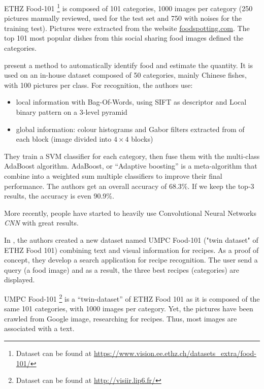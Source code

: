ETHZ Food-101 \footnote{Dataset can be found at  \url{https://www.vision.ee.ethz.ch/datasets_extra/food-101/}} is composed of 101 categories, 1000 images per category (250 pictures manually reviewed, used for the test set and 750 with noises for the training test). Pictures were extracted from the website \href{http://www.foodspotting.com/}{foodspotting.com}. The top 101 most popular dishes from this social sharing food images defined the categories.


\cite{Chen2012} present a method to automatically identify food and estimate the quantity. It is used on an in-house dataset composed of 50 categories, mainly Chinese fishes, with 100 pictures per class. For recognition, the authors use:
\begin{itemize}
    \item local information with Bag-Of-Words, using SIFT as descriptor and Local binary pattern on a 3-level pyramid
    \item global information: colour histograms and Gabor filters extracted from of each block (image divided into $4 \times 4$ blocks)
\end{itemize}

They train a SVM classifier for each category, then fuse them with the multi-class AdaBoost algorithm. AdaBoost, or \enquote{Adaptive boosting} is a meta-algorithm that combine into a weighted sum multiple classifiers to improve their final performance.
The authors get an overall accuracy of 68.3\%. If we keep the top-3 results, the accuracy is even 90.9\%.



More recently, people have started to heavily use Convolutional Neural Networks \textit{CNN} with great results.


In \cite{Wang2015}, the authors created a new dataset named UMPC Food-101 ("twin dataset" of ETHZ Food 101) combining text and visual information for recipes. As a proof of concept, they develop a search application for recipe recognition. The user send a query (a food image) and as a result, the three best recipes (categories) are displayed.

UMPC Food-101 \footnote{Dataset can be found at \url{http://visiir.lip6.fr/}} is a \enquote{twin-dataset} of ETHZ Food 101 as it is composed of the same 101 categories, with 1000 images per category. Yet, the pictures have been crawled from Google image, researching for recipes. Thus, most images are associated with a text.

